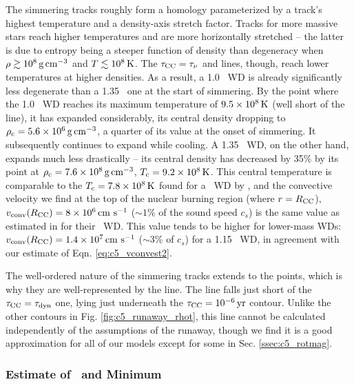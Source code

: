 
The simmering tracks roughly form a homology parameterized by a track's highest temperature and a density-axis stretch factor.  Tracks for more massive stars reach higher temperatures and are more horizontally stretched -- the latter is due to entropy being a steeper function of density than degeneracy when $\rho\gtrsim10^8\,\gcc$ and $T\lesssim10^8\,\mathrm{K}$.  The $\taucc = \taunu$ and \citeal{wooswk04} lines, though, reach lower temperatures at higher densities.  As a result, a 1.0 \Msun\ WD is already significantly less degenerate than a 1.35 \Msun\ one at the start of simmering.  By the point where the 1.0 \Msun\ WD reaches its maximum temperature of $9.5\times10^8\,\mathrm{K}$ (well short of the \citeal{wooswk04} line), it has expanded considerably, its central density dropping to $\rhoc = 5.6\times10^6\,\gcc$, a quarter of its value at the onset of simmering.  It subsequently continues to expand while cooling.  A 1.35 \Msun\ WD, on the other hand, expands much less drastically -- its central density has decreased by 35\% by its \citeal{wooswk04} point at $\rhoc = 7.6\times10^8\,\gcc$, $\Tc = 9.2\times10^8\,\mrm{K}$.  This central temperature is comparable to the $\Tc = 7.8\times10^8\,\mrm{K}$ found for a \Mch\ WD by \citeal{wooswk04}, and the convective velocity we find at the top of the nuclear burning region (where $r = \Rcc$), $\vconvrcc = 8\times10^6\,\cmpsec$ ($\sim1$\% of the sound speed $c_s$) is the same value as estimated in \citeal{wooswk04} for their \Mch\ WD.  This value tends to be higher for lower-mass WDs: $\vconvrcc = 1.4\times10^7\,\cmpsec$ ($\sim3$\% of $c_s$) for a 1.15 \Msun\ WD, in agreement with our estimate of Eqn. \ref{eq:c5_vconvest2}.

The well-ordered nature of the simmering tracks extends to the \citeal{wooswk04} points, which is why they are well-represented by the \citeal{wooswk04} line.  The line falls just short of the $\taucc = \taudyn$ one, lying just underneath the $\taucc = 10^{-6}\,\mrm{yr}$ contour.  Unlike the other contours in Fig. \ref{fig:c5_runaway_rhot}, this line cannot be calculated independently of the assumptions of the runaway, though we find it is a good approximation for all of our models except for some in Sec. \ref{ssec:c5_rotmag}.

\subsubsection{Estimate of \Mcrit\ and Minimum \MNi}
\label{sssec:c5_mcritest_adiabatic}

